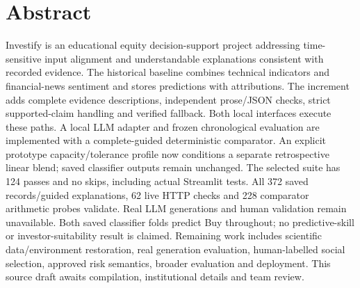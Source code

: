 \chapter*{Abstract}
Investify is an educational equity decision-support project addressing time-sensitive input alignment and understandable explanations consistent with recorded evidence. The historical baseline combines technical indicators and financial-news sentiment and stores predictions with attributions. The increment adds complete evidence descriptions, independent prose/JSON checks, strict supported-claim handling and verified fallback. Both local interfaces execute these paths. A local LLM adapter and frozen chronological evaluation are implemented with a complete-guided deterministic comparator. An explicit prototype capacity/tolerance profile now conditions a separate retrospective linear blend; saved classifier outputs remain unchanged. The selected suite has 124 passes and no skips, including actual Streamlit tests. All 372 saved records/guided explanations, 62 live HTTP checks and 228 comparator arithmetic probes validate. Real LLM generations and human validation remain unavailable. Both saved classifier folds predict Buy throughout; no predictive-skill or investor-suitability result is claimed. Remaining work includes scientific data/environment restoration, real generation evaluation, human-labelled social selection, approved risk semantics, broader evaluation and deployment. This source draft awaits compilation, institutional details and team review.
